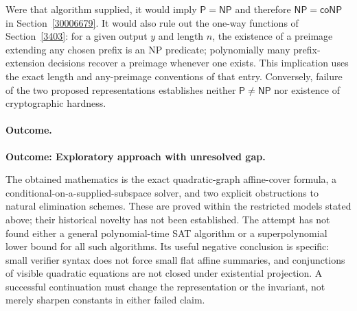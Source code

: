 \documentclass[11pt]{article}
\begin{document}
Were that algorithm supplied, it would imply $\mathsf P=\mathsf{NP}$ and
therefore $\mathsf{NP}=\mathsf{coNP}$ in Section~\ref{30006679}. It would also rule
out the one-way functions of Section~\ref{3403}: for a given output $y$ and
length $n$, the existence of a preimage extending any chosen prefix is an NP
predicate; polynomially many prefix-extension decisions recover a preimage
whenever one exists. This implication uses the exact length and any-preimage
conventions of that entry. Conversely, failure of the two proposed
representations establishes neither $\mathsf P\ne\mathsf{NP}$ nor existence
of cryptographic hardness.

\paragraph{Outcome.}
\textbf{Outcome: Exploratory approach with unresolved gap.}

The obtained mathematics is the exact quadratic-graph affine-cover formula,
a conditional-on-a-supplied-subspace solver, and two explicit obstructions to
natural elimination schemes. These are proved within the restricted models
stated above; their historical novelty has not been established. The attempt
has not found either a general polynomial-time SAT algorithm or a
superpolynomial lower bound for all such algorithms. Its useful negative
conclusion is specific: small verifier syntax does not force small flat
affine summaries, and conjunctions of visible quadratic equations are not
closed under existential projection. A successful continuation must change
the representation or the invariant, not merely sharpen constants in either
failed claim.
\end{document}

